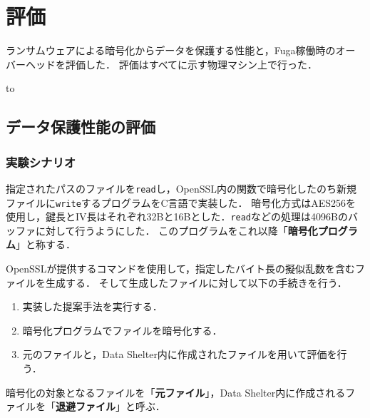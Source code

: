 \chapter{評価}
\label{chap:eval}
ランサムウェアによる暗号化からデータを保護する性能と，Fuga稼働時のオーバーヘッドを評価した．
評価はすべてに示す物理マシン上で行った．
\begin{table}[t]
  \caption{Environment of the physical machine used for the evaluation.}
  \label{tab:experiment-machine-kashiwa}
  \hbox to
\end{table}

\section{データ保護性能の評価}
\subsection{実験シナリオ}
指定されたパスのファイルを\texttt{read}し，OpenSSL内の関数で暗号化したのち新規ファイルに\texttt{write}するプログラムをC言語で実装した．
暗号化方式はAES256を使用し，鍵長とIV長はそれぞれ32Bと16Bとした．\texttt{read}などの処理は4096Bのバッファに対して行うようにした．
このプログラムをこれ以降「\textbf{暗号化プログラム}」と称する．

OpenSSLが提供するコマンドを使用して，指定したバイト長の擬似乱数を含むファイルを生成する．
そして生成したファイルに対して以下の手続きを行う．
\begin{enumerate}
  \item 実装した提案手法を実行する．
  \item 暗号化プログラムでファイルを暗号化する．
  \item 元のファイルと，Data Shelter内に作成されたファイルを用いて評価を行う．
\end{enumerate}
暗号化の対象となるファイルを「\textbf{元ファイル}」，Data Shelter内に作成されるファイルを「\textbf{退避ファイル}」と呼ぶ．


